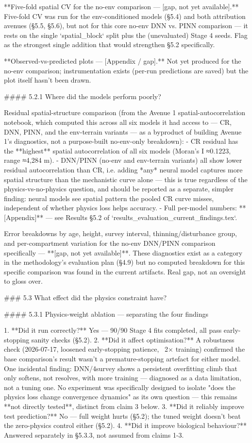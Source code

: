 **Five-fold spatial CV for the no-env comparison — [gap, not yet available].** Five-fold CV was run for the env-conditioned models (§5.4) and both attribution avenues (§5.5, §5.6), but not for this core no-env DNN vs. PINN comparison — it rests on the single `spatial_block` split plus the (unevaluated) Stage 4 seeds. Flag as the strongest single addition that would strengthen §5.2 specifically.

**Observed-vs-predicted plots — [Appendix / gap].** Not yet produced for the no-env comparison; instrumentation exists (per-run predictions are saved) but the plot itself hasn't been drawn.

#### 5.2.1 Where did the models perform poorly?

Residual spatial-structure comparison (from the Avenue 1 spatial-autocorrelation notebook, which computed this across all six models it had access to — CR, DNN, PINN, and the env-terrain variants — as a byproduct of building Avenue 1's diagnostics, not a purpose-built no-env-only breakdown):
- CR residual has the **highest** spatial autocorrelation of all six models (Moran's I ≈0.1223, range ≈4,284 m).
- DNN/PINN (no-env and env-terrain variants) all show lower residual autocorrelation than CR, i.e. adding *any* neural model captures more spatial structure than the mechanistic curve alone — this is true regardless of the physics-vs-no-physics question, and should be reported as a separate, simpler finding: neural models see spatial pattern the pooled CR curve misses, independent of whether physics loss helps accuracy.
- Full per-model numbers: **[Appendix]** — see Results §5.2 of `results_evaluation_current_findings.tex`.

Error breakdowns by age, height, survey interval, thinning/disturbance group, and per-compartment variation for the no-env DNN/PINN comparison specifically — **[gap, not yet available]**. These diagnostics exist as a category in the methodology's evaluation plan (§4.9) but no computed breakdown for this specific comparison was found in the current artifacts. Real gap, not an oversight to gloss over.

### 5.3 What effect did the physics constraint have?

#### 5.3.1 Physics-weight ablation — separating the four findings

1. **Did it run correctly?** Yes — 90/90 Stage 4 fits completed, all pass early-stopping sanity checks (§5.2).
2. **Did it affect optimisation?** A robustness check (2026-07-17, loosened early-stopping patience, ~2× training) confirmed the base comparison's result wasn't a premature-stopping artefact for either model. One incidental finding: DNN/4survey shows a persistent overfitting climb that only softens, not resolves, with more training — diagnosed as a data limitation, not a tuning one. No experiment was specifically designed to isolate "does the physics loss change convergence dynamics" as its own question — this remains **not directly tested**, distinct from claim 3 below.
3. **Did it reliably improve test prediction?** No — full weight hurts (§5.2); the tuned weight doesn't beat the zero-physics control either (§5.2).
4. **Did it improve biological behaviour?** Answered separately in §5.3.3, not assumed from claims 1-3.

